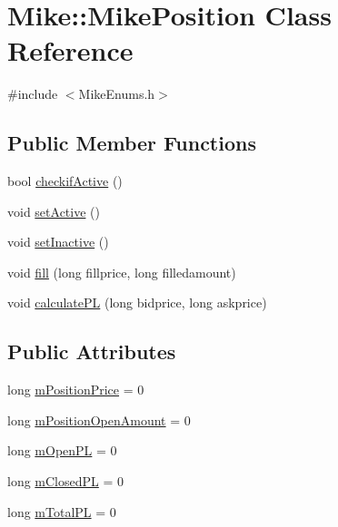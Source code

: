 \hypertarget{class_mike_1_1_mike_position}{}\section{Mike\+:\+:Mike\+Position Class Reference}
\label{class_mike_1_1_mike_position}


{\ttfamily \#include $<$Mike\+Enums.\+h$>$}

\subsection*{Public Member Functions}
\begin{DoxyCompactItemize}
\item 
bool \hyperlink{class_mike_1_1_mike_position_acd1cfa66162ab937ac369a25645b7ac3}{checkif\+Active} ()
\item 
void \hyperlink{class_mike_1_1_mike_position_acc61ff4360ca7ff0adc2773f4e6edbfa}{set\+Active} ()
\item 
void \hyperlink{class_mike_1_1_mike_position_a676371436dcf535be28c28eb45fc237d}{set\+Inactive} ()
\item 
void \hyperlink{class_mike_1_1_mike_position_a2bfb2f57faa3be7f9958345ddb438b03}{fill} (long fillprice, long filledamount)
\item 
void \hyperlink{class_mike_1_1_mike_position_a4530507292631b2accf01cf35c49103b}{calculate\+PL} (long bidprice, long askprice)
\end{DoxyCompactItemize}
\subsection*{Public Attributes}
\begin{DoxyCompactItemize}
\item 
long \hyperlink{class_mike_1_1_mike_position_aeb47a1ecac92630f59c4ce24da59cc7b}{m\+Position\+Price} = 0
\item 
long \hyperlink{class_mike_1_1_mike_position_a3d55782c0ee13efca342ca0c7cb8431e}{m\+Position\+Open\+Amount} = 0
\item 
long \hyperlink{class_mike_1_1_mike_position_a63c1b720a7b83cad039a584cb41133c8}{m\+Open\+PL} = 0
\item 
long \hyperlink{class_mike_1_1_mike_position_a3f4c68d85dec90c8ad5d5d0c4eafb249}{m\+Closed\+PL} = 0
\item 
long \hyperlink{class_mike_1_1_mike_position_a93759730506f9f9b612c6f5f2b79935d}{m\+Total\+PL} = 0
\end{DoxyCompactItemize}

